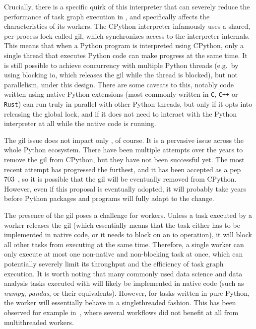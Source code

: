 Crucially, there is a specific quirk of this interpreter that can severely reduce the performance
of task graph execution in \dask{}, and specifically affects the
characteristics of its workers. The CPython interpreter infamously uses a shared, per-process lock
called \gls{gil}, which synchronizes access to the interpreter internals. This
means that when a Python program is interpreted using CPython, only a single thread that executes
Python code can make progress at the same time. It is still possible to achieve concurrency with
multiple Python threads (e.g.\ by using blocking \gls{io}, which releases the
\gls{gil} while the thread is blocked), but not parallelism, under this design.
There are some caveats to this, notably code written using native Python extensions (most commonly
written in \texttt{C}, \texttt{C++} or \texttt{Rust})
can run truly in parallel with other Python threads, but only if it opts into releasing the global
lock, and if it does not need to interact with the Python interpreter at all while the native code
is running.

The \gls{gil} issue does not impact only \dask{}, of course.
It is a pervasive issue across the whole Python ecosystem. There have been multiple attempts over
the years to remove the \gls{gil} from CPython, but they have not been successful
yet. The most recent attempt has progressed the furthest, and it has been accepted as a
\gls{pep} 703~\cite{pep703}, so it is possible that the
\gls{gil} will be eventually removed from CPython. However, even if this proposal
is eventually adopted, it will probably take years before Python packages and programs will fully
adapt to the change.

The presence of the \gls{gil} poses a challenge for \dask{}
workers. Unless a task executed by a worker releases the \gls{gil} (which essentially means that the task either has to be
implemented in native code, or it needs to block on an \gls{io} operation), it will block
all other tasks from executing at the same time. Therefore, a single \dask{}
worker can only execute at most one non-native and non-blocking task at once, which can potentially
severely limit its throughput and the efficiency of task graph execution. It is worth noting that
many commonly used data science and data analysis tasks executed with \dask{}
will likely be implemented in native code (such as \emph{numpy},
\emph{pandas}, or their \dask{} equivalents). However, for tasks
written in pure Python, the worker will essentially behave in a singlethreaded fashion. This has
been observed for example in~\cite{dasksparkcomparison}, where several workflows did not benefit
at all from multithreaded \dask{} workers.

